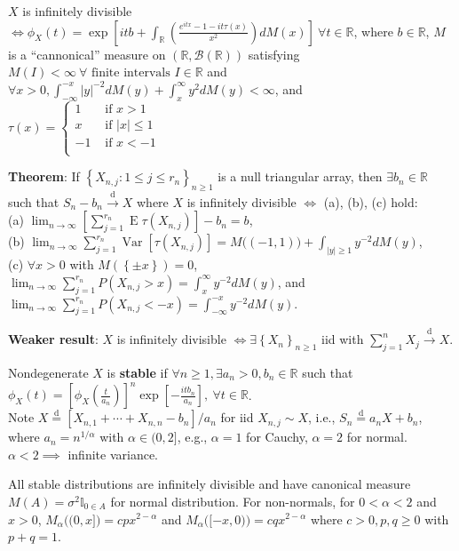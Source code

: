 \documentclass[paper=letter,fontsize=2.89mm]{scrartcl}
\DeclareMathOperator{\Var}{Var}
\DeclareMathOperator{\E}{E}
\newcommand{\eqdist}{\stackrel{\text{d}}{=}}
\newcommand{\convdist}{\stackrel{\text{d}}{\longrightarrow}}
\newcommand{\Borel}{\mathcal{B}}
\newcommand{\R}{\mathbb{R}}
\newcommand\indicate[1]{\mathbb{I}_{ #1 }}
\newcommand\abs[1]{\left| #1 \right|}
\newcommand\set[1]{\left\{ #1 \right\}}
\begin{document}
\begin{multicols*}{3}
$X$ is infinitely divisible $\iff \phi_X(t) = \exp\left[ itb + \int_\R \left( \frac{e^{itx} - 1 - it\tau(x)}{x^2}\right)dM(x)  \right] ~ \forall t \in \R$,
where $b \in \R$, $M$ is a ``cannonical'' measure on $(\R, \Borel(\R))$ satisfying $M(I) < \infty ~ \forall \text{ finite intervals } I \in \R$ and $\forall x > 0, \int_{-\infty}^{-x} \abs{y}^{-2} dM(y) + \int_x^\infty y^2 dM(y) < \infty$, and $\tau(x) =  \left\{ \begin{array}{rl}
 1 &\mbox{ if $x > 1$} \\
 x &\mbox{ if $\abs{x} \le 1$} \\
 -1 &\mbox{ if $x <- 1$} \\
       \end{array} \right.$ \\ \medskip
       
 \textbf{Theorem}: If $\set{X_{n,j}: 1 \le j \le r_n}_{n\ge1}$ is a null triangular array, then $\exists b_n \in \R$ such that $S_n - b_n \convdist X$ where $X$ is infinitely divisible $\iff$ (a), (b), (c) hold: \\
 (a) $\lim_{n\to\infty} \left[\sum_{j=1}^{r_n} \E \tau(X_{n,j})\right] - b_n = b$, \\
 (b) $\lim_{n\to\infty} \sum_{j=1}^{r_n}\Var\left[ \tau(X_{n,j})\right] = M\big((-1,1)\big) + \int_{\abs{y} \ge 1} y^{-2}dM(y)$, \\
 (c) $\forall x > 0$ with $M(\set{\pm x}) = 0$, $\lim_{n\to\infty} \sum_{j=1}^{r_n} P(X_{n,j} > x) = \int_x^\infty y^{-2} dM(y)$, and  $\lim_{n\to\infty} \sum_{j=1}^{r_n} P(X_{n,j} < -x) = \int_{-\infty}^{-x} y^{-2} dM(y)$. \\ \medskip


\textbf{Weaker result}: $X$ is infinitely divisible $\iff \exists \set{X_n}_{n\ge1}$ iid with $\sum_{j=1}^n X_j \convdist X$. \\ \medskip

Nondegenerate $X$ is \textbf{stable} if $\forall n \ge1, \exists a_n > 0, b_n \in \R$ such that $\phi_X(t) = \left[ \phi_X\left( \frac{t}{a_n}\right)\right]^n \exp\left[ - \frac{itb_n}{a_n} \right], ~\forall t\in \R$. \\
Note $X \eqdist [X_{n,1} + \cdots + X_{n,n} - b_n]/a_n$ for iid $X_{n,j} \sim X$, i.e., $S_n \eqdist a_nX + b_n$, where $a_n = n^{1/\alpha}$ with $\alpha \in (0,2]$, e.g., $\alpha = 1$ for Cauchy, $\alpha = 2$ for normal.  $\alpha < 2 \implies$  infinite variance. \\ \medskip

All stable distributions are infinitely divisible and have canonical measure $M(A) = \sigma^2\indicate{0 \in A}$ for normal distribution. For non-normals, for $0 < \alpha < 2$ and $x > 0$, $M_\alpha\big((0,x]\big) = cpx^{2-\alpha}$ and $M_\alpha\big([-x, 0)\big) = cqx^{2-\alpha}$ where $c > 0, p,q \ge 0$ with $p + q = 1$. \\ \medskip


\end{multicols*}
\end{document}
